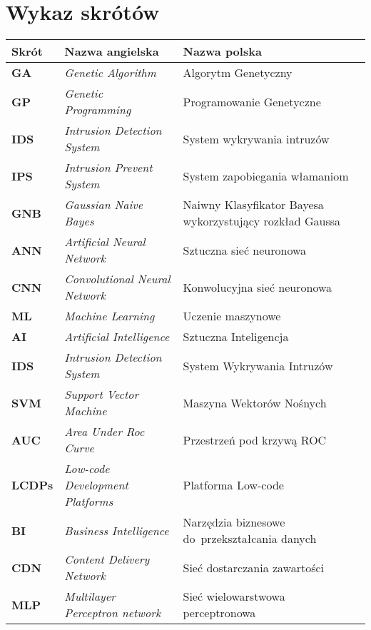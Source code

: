 \section*{Wykaz skrótów}

\begin{table}[H]
    \centering
    \begin{tabularx}{\linewidth}{lXX}
        \textbf{Skrót} & \textbf{Nazwa angielska} & \textbf{Nazwa polska} \\ \hline
        \textbf{GA} & \textit{Genetic Algorithm} & Algorytm Genetyczny \\ \hline
        \textbf{GP} & \textit{Genetic Programming} & Programowanie Genetyczne \\ \hline
        \textbf{IDS} & \textit{Intrusion Detection System} & System wykrywania intruzów  \\ \hline
        \textbf{IPS} & \textit{Intrusion Prevent System} & System zapobiegania włamaniom \\ \hline
        \textbf{GNB} & \textit{Gaussian Naive Bayes} & Naiwny Klasyfikator Bayesa wykorzystujący rozkład Gaussa \\ \hline
        \textbf{ANN} & \textit{Artificial Neural Network} & Sztuczna sieć neuronowa \\ \hline
        \textbf{CNN} & \textit{Convolutional Neural Network} & Konwolucyjna sieć neuronowa \\ \hline
        \textbf{ML} & \textit{Machine Learning} & Uczenie maszynowe \\ \hline
        \textbf{AI} & \textit{Artificial Intelligence} & Sztuczna Inteligencja \\ \hline
        \textbf{IDS} & \textit{Intrusion Detection System} & System Wykrywania Intruzów \\ \hline
        \textbf{SVM} & \textit{Support Vector Machine} & Maszyna Wektorów Nośnych \\ \hline
        \textbf{AUC} & \textit{Area Under Roc Curve} & Przestrzeń pod krzywą ROC \\ \hline
        \textbf{LCDPs} & \textit{Low-code Development Platforms} & Platforma Low-code \\ \hline
        \textbf{BI} & \textit{Business Intelligence} & Narzędzia biznesowe do~przekształcania danych \\ \hline
        \textbf{CDN} & \textit{Content Delivery Network} & Sieć dostarczania zawartości \\ \hline
        \textbf{MLP} & \textit{Multilayer Perceptron network} & Sieć wielowarstwowa perceptronowa \\ \hline

\end{tabularx}
\end{table}
